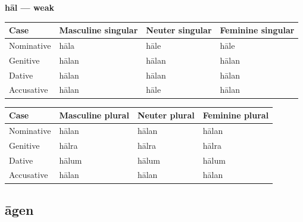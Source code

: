\textbf{hāl — weak}

\par\begingroup
\fontsize{10.5}{13.2}\selectfont
\setlength{\LTleft}{0pt}\setlength{\LTright}{\fill}
\noindent
\begin{tabular}{@{}>{\raggedright\arraybackslash}p{22.0mm}>{\raggedright\arraybackslash}p{31.188mm}>{\raggedright\arraybackslash}p{31.188mm}>{\raggedright\arraybackslash}p{31.188mm}@{}}
\toprule
\textbf{Case} & \textbf{Masculine singular} & \textbf{Neuter singular} & \textbf{Feminine singular} \\
\midrule
Nominative & hāla & hāle & hāle \\
Genitive & hālan & hālan & hālan \\
Dative & hālan & hālan & hālan \\
Accusative & hālan & hāle & hālan \\
\bottomrule
\end{tabular}
\par\endgroup
\par\addvspace{5pt}
\par\begingroup
\fontsize{10.5}{13.2}\selectfont
\setlength{\LTleft}{0pt}\setlength{\LTright}{\fill}
\noindent
\begin{tabular}{@{}>{\raggedright\arraybackslash}p{22.0mm}>{\raggedright\arraybackslash}p{31.188mm}>{\raggedright\arraybackslash}p{31.188mm}>{\raggedright\arraybackslash}p{31.188mm}@{}}
\toprule
\textbf{Case} & \textbf{Masculine plural} & \textbf{Neuter plural} & \textbf{Feminine plural} \\
\midrule
Nominative & hālan & hālan & hālan \\
Genitive & hālra & hālra & hālra \\
Dative & hālum & hālum & hālum \\
Accusative & hālan & hālan & hālan \\
\bottomrule
\end{tabular}
\par\endgroup

\subsection*{āgen}

